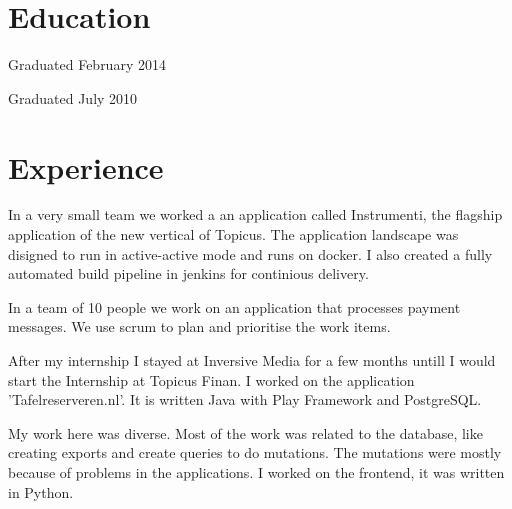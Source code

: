 \documentclass[]{deedy-resume-openfont}
\begin{document}
\begin{minipage}[t]{0.66\textwidth} 
	

\section{Education} 

Graduated February 2014 
\sectionsep

Graduated July 2010 
\sectionsep


\section{Experience}

In a very small team we worked a an application called Instrumenti, the flagship application of the new vertical of Topicus.
The application landscape was disigned to run in active-active mode and runs on docker. 
I also created a fully automated build pipeline in jenkins for continious delivery.
\sectionsep

In a team of 10 people we work on an application that processes payment messages. 
We use scrum to plan and prioritise the work items.
\sectionsep

After my internship I stayed at Inversive Media for a few months untill I would start the Internship at Topicus Finan.
I worked on the application 'Tafelreserveren.nl'. It is written Java with Play Framework and PostgreSQL.
\sectionsep

My work here was diverse. 
Most of the work was related to the database, like creating exports and create queries to do mutations.
The mutations were mostly because of problems in the applications.
I worked on the frontend, it was written in Python.
\sectionsep


\end{minipage}
\end{document}
